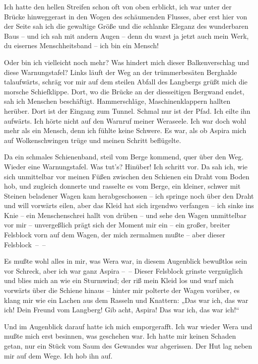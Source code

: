 Ich hatte den hellen Streifen schon oft von oben erblickt, ich war
unter der Brücke hinweggerast in den Wogen des schäumenden Flusses,
aber erst hier von der Seite sah ich die gewaltige Größe und die
schlanke Eleganz des wunderbaren Baus – und ich sah mit andern
Augen – denn du warst ja jetzt auch mein Werk, du eisernes
Menschheitsband – ich bin ein Mensch!

Oder bin ich vielleicht noch mehr? Was hindert mich dieser
Balkenverschlag und diese Warnungstafel? Links läuft der Weg an der
trümmerbesäten Berghalde talaufwärts, schräg vor mir auf dem
steilen Abfall des Langbergs grüßt mich die morsche Schiefklippe.
Dort, wo die Brücke an der diesseitigen Bergwand endet, sah ich
Menschen beschäftigt. Hammerschläge, Maschinenklappern hallten
herüber. Dort ist der Eingang zum Tunnel. Schmal nur ist der Pfad.
Ich eilte ihn aufwärts. Ich hörte nicht auf den Warnruf meiner
Weraseele. Ich war doch wohl mehr als ein Mensch, denn ich fühlte
keine Schwere. Es war, als ob Aspira mich auf Wolkenschwingen trüge
und meinen Schritt beflügelte.

Da ein schmales Schienenband, steil vom Berge kommend, quer über
den Weg. Wieder eine Warnungstafel. Was tut's? Hinüber! Ich schritt
vor. Da sah ich, wie sich unmittelbar vor meinen Füßen zwischen den
Schienen ein Draht vom Boden hob, und zugleich donnerte und
rasselte es vom Berge, ein kleiner, schwer mit Steinen beladener
Wagen kam herabgeschossen – ich springe noch über den Draht und
will vorwärts eilen, aber das Kleid hat sich irgendwo verfangen –
ich sinke ins Knie – ein Menschenschrei hallt von drüben – und sehe
den Wagen unmittelbar vor mir – unvergeßlich prägt sich der Moment
mir ein – ein großer, breiter Felsblock vorn auf dem Wagen, der
mich zermalmen mußte – aber dieser Felsblock~–~–

Es mußte wohl alles in mir, was Wera war, in diesem Augenblick
bewußtlos sein vor Schreck, aber ich war ganz Aspira –~– Dieser
Felsblock grinste vergnüglich und blies mich an wie ein Sturmwind;
der riß mein Kleid los und warf mich vorwärts über die Schiene
hinaus – hinter mir polterte der Wagen vorüber, es klang mir wie
ein Lachen aus dem Rasseln und Knattern: „Das war ich, das war ich!
Dein Freund vom Langberg! Gib acht, Aspira! Das war ich, das war
ich!“

Und im Augenblick darauf hatte ich mich emporgerafft. Ich war
wieder Wera und mußte mich erst besinnen, was geschehen war. Ich
hatte mir keinen Schaden getan, nur ein Stück vom Saum des Gewandes
war abgerissen. Der Hut lag neben mir auf dem Wege. Ich hob ihn
auf.

